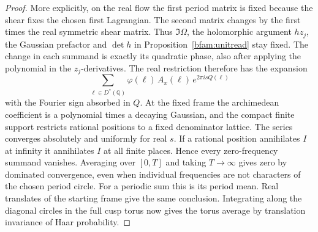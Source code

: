 \begin{proof}
More explicitly, on the real flow the first period matrix is fixed
because the shear fixes the chosen first Lagrangian. The second
matrix changes by the first times the real symmetric shear matrix.
Thus \(\Im\Omega\), the holomorphic argument \(hz_j\), the Gaussian
prefactor and \(\det h\) in Proposition~\ref{bfam:unitread} stay
fixed. The change in each summand is exactly its quadratic phase,
also after applying the polynomial in the \(z_j\)-derivatives.
The real restriction therefore has the expansion
\[
            \sum_{\ell\in D^*(\mathbb Q)}
                 \varphi(\ell)\,A_x(\ell)\,e^{2\pi i s Q(\ell)}
\]
with the Fourier sign absorbed in \(Q\). At the fixed frame the
archimedean coefficient is a polynomial times a decaying Gaussian,
and the compact finite support restricts rational positions to a
fixed denominator lattice. The series converges absolutely and
uniformly for real \(s\). If a rational position annihilates \(I\)
at infinity it annihilates \(I\) at all finite places. Hence every
zero-frequency summand vanishes. Averaging over \([0,T]\) and
taking \(T\to\infty\) gives zero by dominated convergence, even
when individual frequencies are not characters of the chosen
period circle. For a periodic sum this is its period mean.
Real translates of the starting frame give the same conclusion.
Integrating along the diagonal circles in the full cusp torus now
gives the torus average by translation invariance of Haar probability.
\end{proof}


